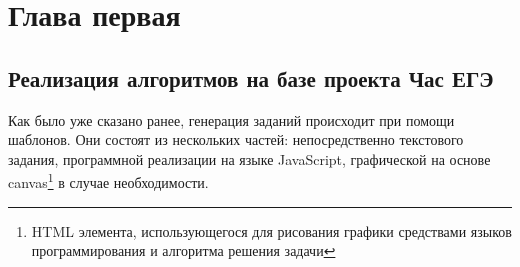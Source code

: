 
\section{Глава первая}
\subsection{Реализация алгоритмов на базе проекта Час ЕГЭ}
Как было уже сказано ранее, генерация заданий происходит при помощи шаблонов.
Они состоят из нескольких частей: непосредственно текстового задания, программной реализации на языке JavaScript,
графической на основе canvas\footnote{HTML элемента, использующегося для рисования графики средствами языков программирования и алгоритма решения задачи} в случае необходимости.

